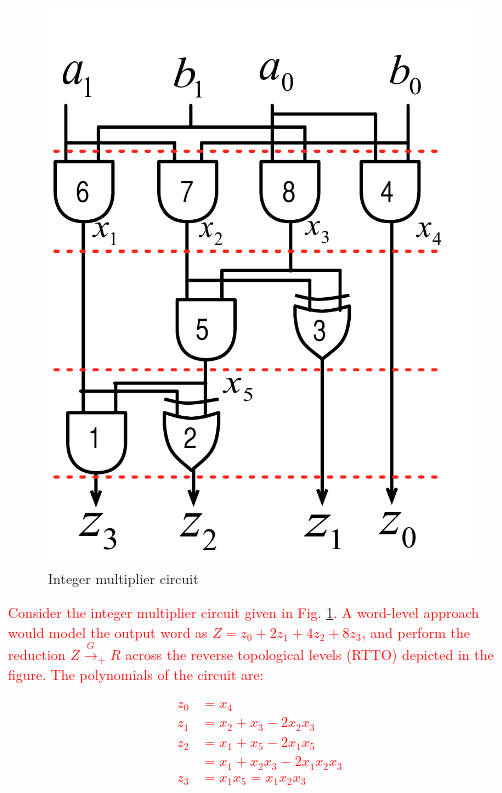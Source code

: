 \begin{figure}[hbt]
\centering
\includegraphics[scale=0.4]{2-bit-mult.pdf}
\caption{Integer multiplier circuit}
\label{intmult}
\end{figure}


\textcolor{red}{Consider the integer multiplier circuit given in
  Fig. \ref{intmult}. A 
word-level approach would model the output word as 
$Z = z_0 + 2z_1 + 4 z_2 + 8 z_3$, and perform the reduction
$Z\xrightarrow{G}_+R$ across the reverse topological levels (RTTO) 
depicted in the figure. The polynomials of the circuit are:} 

\textcolor{red}{\begin{align*}
z_0 &= x_4\\
z_1 &= x_2 + x_3 - 2x_2x_3\\
z_2 &= x_1 + x_5 - 2 x_1 x_5\\
    &= x_1 + x_2x_3 - 2x_1x_2x_3\\
z_3 &= x_1x_5 = x_1x_2x_3
\end{align*}}

